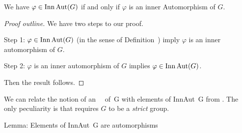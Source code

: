 \begin{theorem}
We have $\varphi\in\operatorname{Inn}\operatorname{Aut}(G)$ if and only if $\varphi$ is an inner
Automorphism of $G$.
\end{theorem}

\begin{proof}[Proof outline]
  We have two steps to our proof.

  Step 1: $\varphi\in\operatorname{Inn}\operatorname{Aut}(G)$ (in the sense of Definition~)
  imply $\varphi$ is an inner automorphism of $G$.

  Step 2: $\varphi$ is an inner automorphism of $G$ implies $\varphi\in\operatorname{Inn}\operatorname{Aut}(G)$.

  Then the result follows.
\end{proof}

\begin{thm-remark}
We can relate the notion of an {\Tt{}\ \ of\ G\nwendquote} with elements
of {\Tt{}InnAut\ G\nwendquote} from . The only peculiarity is that
 requires $G$ to be a \emph{strict} group.
\end{thm-remark}

\nwenddocs{}\endmoddef\nwstartdeflinemarkup{}\nwenddeflinemarkup
\LA{}Lemma: Elements of \code{}InnAut\ G\edoc{} are automorphisms~{\nwtagstyle{}}\RA{}

